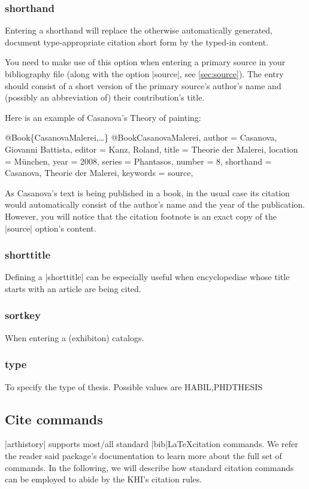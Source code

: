 \documentclass[a4paper,
10pt,
ngerman,
english
]{ltxdoc}
\begin{document}
\subsubsection{shorthand}\label{sec:shorthand}
Entering a shorthand will replace the otherwise automatically generated, document type-appropriate citation short form by the typed-in content.

You need to make use of this option when entering a primary source in your bibliography file (along with the option |source|, see \cref{sec:source}). The entry should consist of a short version of the primary source's author's name and (possibly an abbreviation of) their contribution's title.

Here is an example of Casanova's Theory of painting:
\begin{bibexample}[label=CasanovaMalerei]{{@}Book\{CasanovaMalerei,…\}}
@Book{CasanovaMalerei,
  author    = {Casanova, Giovanni Battista},
  editor    = {Kanz, Roland},
  title     = {Theorie der Malerei},
  location  = {München},
  year      = {2008},
  series    = {Phantasos},
  number    = {8},
  shorthand = {Casanova, Theorie der Malerei},
  keywords  = {source},
}
\end{bibexample}
As Casanova's text is being published in a book, in the usual case its citation would automatically consist of the author's name and the year of the publication.
However, you will notice that the citation footnote is an exact copy of the |source| option's content.

\subsubsection{shorttitle}
Defining a |shorttitle| can be especially useful when encyclopediae whose title starts with an article are being cited.

\subsubsection{sortkey}
When entering a (exhibiton) catalogs.

\subsubsection{type}
To specify the type of thesis. Possible values are HABIL,PHDTHESIS


\subsection{Cite commands}\label{cite-commands}
|arthistory| supports most/all standard |bib|\LaTeX citation commands. We refer the reader said package's documentation to learn more about the full set of commands. In the following, we will describe how standard citation commands can be employed to abide by the KHI's citation rules.
\end{document}
